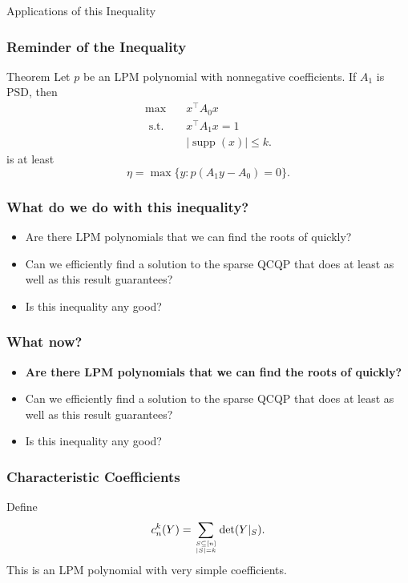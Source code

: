 \documentclass{beamer}
\DeclareMathOperator*{\supp}{supp}
\newcommand{\st}{{\text{ s.t. }}}
\renewcommand\top[2]{\genfrac{}{}{0pt}{}{#1}{#2}}
\begin{document}
\begin{frame}
    \centering
    \huge
    {\color{gray}Applications of this Inequality}
\end{frame}
\begin{frame}
    \frametitle{Reminder of the Inequality}
    \begin{block}{Theorem}
        Let $p$ be an LPM polynomial with nonnegative coefficients.  If $A_1$ is PSD, then
        \begin{equation*}
            \begin{aligned}
                \max\quad & x^{\intercal}A_0x\\
                \st & x^{\intercal}A_1x = 1\\
                    &|\supp(x)| \le k.
            \end{aligned}
        \end{equation*}
        is at least 
        \[
            \eta = \max \{y : p(A_1y-A_0) = 0 \}.
        \]
    \end{block}
\end{frame}
\begin{frame}
    \frametitle{What do we do with this inequality?}
    \begin{itemize}
        \item Are there LPM polynomials that we can find the roots of quickly?
        \pause 
        \item Can we efficiently find a solution to the sparse QCQP that does at least as well as this result guarantees?
        \pause
        \item Is this inequality any good?
    \end{itemize}
\end{frame}
\begin{frame}
    \frametitle{What now?}
    \begin{itemize}
        \item \textbf{Are there LPM polynomials that we can find the roots of quickly?}
        \item Can we efficiently find a solution to the sparse QCQP that does at least as well as this result guarantees?
        \item Is this inequality any good?
    \end{itemize}
\end{frame}
\begin{frame}
    \frametitle{Characteristic Coefficients}
    Define
    \[
        c_n^k(Y) = \sum_{\top{S \subseteq [n]}{|S| = k}}  \det(Y|_S).
    \]
    \pause 
    This is an LPM polynomial with very simple coefficients.
\end{frame}
\end{document}
